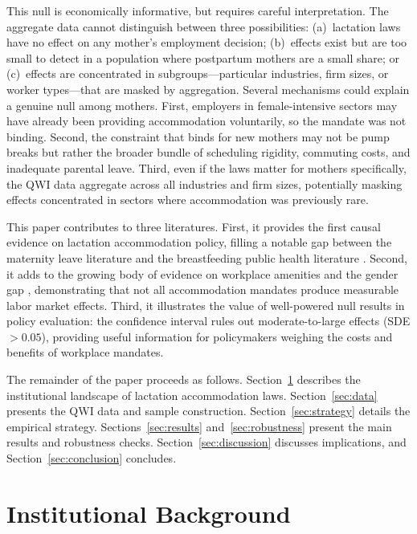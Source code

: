 \documentclass[12pt]{article}
\begin{document}
This null is economically informative, but requires careful interpretation. The aggregate data cannot distinguish between three possibilities: (a)~lactation laws have no effect on any mother's employment decision; (b)~effects exist but are too small to detect in a population where postpartum mothers are a small share; or (c)~effects are concentrated in subgroups---particular industries, firm sizes, or worker types---that are masked by aggregation. Several mechanisms could explain a genuine null among mothers. First, employers in female-intensive sectors may have already been providing accommodation voluntarily, so the mandate was not binding. Second, the constraint that binds for new mothers may not be pump breaks but rather the broader bundle of scheduling rigidity, commuting costs, and inadequate parental leave. Third, even if the laws matter for mothers specifically, the QWI data aggregate across all industries and firm sizes, potentially masking effects concentrated in sectors where accommodation was previously rare.

This paper contributes to three literatures. First, it provides the first causal evidence on lactation accommodation policy, filling a notable gap between the maternity leave literature \citep{baker2008, rossinslater2018} and the breastfeeding public health literature \citep{guendelman2009}. Second, it adds to the growing body of evidence on workplace amenities and the gender gap \citep{wiswall2018, mas2017, goldin2014}, demonstrating that not all accommodation mandates produce measurable labor market effects. Third, it illustrates the value of well-powered null results in policy evaluation: the confidence interval rules out moderate-to-large effects (SDE $> 0.05$), providing useful information for policymakers weighing the costs and benefits of workplace mandates.

The remainder of the paper proceeds as follows. Section~\ref{sec:background} describes the institutional landscape of lactation accommodation laws. Section~\ref{sec:data} presents the QWI data and sample construction. Section~\ref{sec:strategy} details the empirical strategy. Sections~\ref{sec:results} and~\ref{sec:robustness} present the main results and robustness checks. Section~\ref{sec:discussion} discusses implications, and Section~\ref{sec:conclusion} concludes.


\section{Institutional Background}
\label{sec:background}
\end{document}
